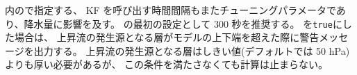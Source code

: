 内ので指定する、
KF を呼び出す時間間隔もまたチューニングパラメータであり、降水量に影響を及す。
の最初の設定として 300 秒を推奨する。
を\verb|true|にした場合は、
上昇流の発生源となる層がモデルの上下端を超えた際に警告メッセージを出力する。
上昇流の発生源となる層はしきい値(デフォルトでは 50 hPa)よりも厚い必要があるが、
この条件を満たさなくても計算は止まらない。
